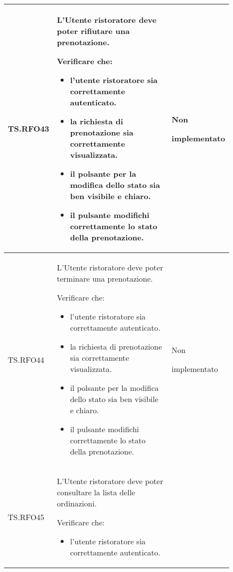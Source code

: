 \begin{longtable}{|p{0.10\linewidth}|p{0.70\linewidth}|p{0.12\linewidth}|}
	TS.RFO43                                                                                                                        &
	L’Utente ristoratore deve poter rifiutare una prenotazione. \par
	Verificare che:
	\begin{itemize}
		\item l'utente ristoratore sia correttamente autenticato.
		\item la richiesta di prenotazione sia correttamente visualizzata.
		\item il polsante per la modifica dello stato sia ben visibile e chiaro.
		\item il pulsante modifichi correttamente lo stato della prenotazione.
	\end{itemize}                                                        &
	Non \par implementato                                                                                                                                                   \\
	\hline
	TS.RFO44                                                                                                                        &
	L’Utente ristoratore deve poter terminare una prenotazione. \par
	Verificare che:
	\begin{itemize}
		\item l'utente ristoratore sia correttamente autenticato.
		\item la richiesta di prenotazione sia correttamente visualizzata.
		\item il polsante per la modifica dello stato sia ben visibile e chiaro.
		\item il pulsante modifichi correttamente lo stato della prenotazione.
	\end{itemize}                                                        &
	Non \par implementato                                                                                                                                                   \\
	\hline
	TS.RFO45                                                                                                                        &
	L’Utente ristoratore deve poter consultare la lista delle ordinazioni. \par
	Verificare che:
	\begin{itemize}
		\item l'utente ristoratore sia correttamente autenticato.

\end{itemize}
\end{longtable}

